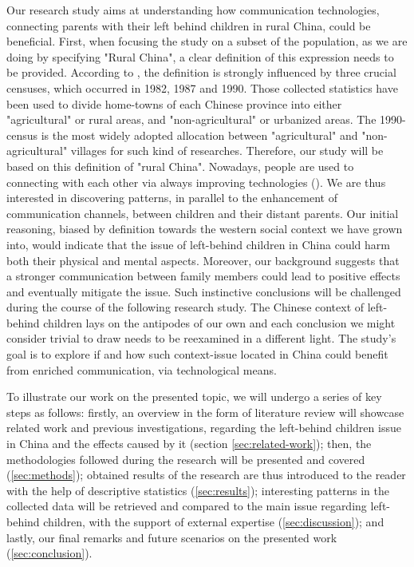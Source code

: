 Our research study aims at understanding how communication technologies, connecting parents with their left behind children in rural China, could be beneficial. First, when focusing the study on a subset of the population, as we are doing by specifying "Rural China", a clear definition of this expression needs to be provided. According to \cite{shen1995rural}, the definition is strongly influenced by three crucial censuses, which occurred in 1982, 1987 and 1990. Those collected statistics have been used to divide home-towns of each Chinese province into either "agricultural" or rural areas, and "non-agricultural" or urbanized areas. The 1990-census is the most widely adopted allocation between "agricultural" and "non-agricultural" villages for such kind of researches. Therefore, our study will be based on this definition of "rural China". Nowadays, people are used to connecting with each other via always improving technologies (\cite{bird2018constantly}). We are thus interested in discovering patterns, in parallel to the enhancement of communication channels, between children and their distant parents. Our initial reasoning, biased by definition towards the western social context we have grown into, would indicate that the issue of left-behind children in China could harm both their physical and mental aspects. Moreover, our background suggests that a stronger communication between family members could lead to positive effects and eventually mitigate the issue. Such instinctive conclusions will be challenged during the course of the following research study. The Chinese context of left-behind children lays on the antipodes of our own and each conclusion we might consider trivial to draw needs to be reexamined in a different light. The study's goal is to explore if and how such context-issue located in China could benefit from enriched communication, via technological means.

To illustrate our work on the presented topic, we will undergo a series of key steps as follows: firstly, an overview in the form of literature review will showcase related work and previous investigations, regarding the left-behind children issue in China and the effects caused by it (section \ref{sec:related-work}); then, the methodologies followed during the research will be presented and covered (\ref{sec:methods}); obtained results of the research are thus introduced to the reader with the help of descriptive statistics (\ref{sec:results}); interesting patterns in the collected data will be retrieved and compared to the main issue regarding left-behind children, with the support of external expertise (\ref{sec:discussion}); and lastly, our final remarks and future scenarios on the presented work (\ref{sec:conclusion}).

